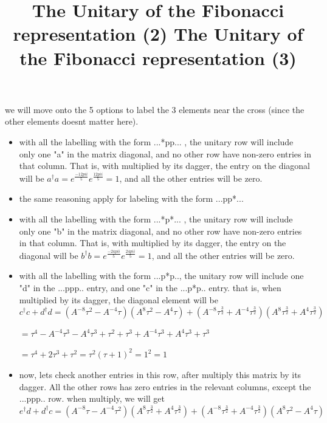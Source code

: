 \documentclass{article}
\begin{document}
{we will move onto the 5 options to label the 3 elements near the cross (since the other elements doesnt matter here).
\begin{itemize}
\item with all the labelling with the form ...*pp... , the unitary row will include only one "a" in the matrix diagonal, and no other row have non-zero entries in that column. That is, with multiplied by its dagger, the entry on the diagonal will be \(a^{\dagger}a = e^{\frac{-12{pi}i}{5}}e^{\frac{12{pi}i}{5}} = 1\), and all the other entries will be zero.
\item the same reasoning apply for labeling with the form ...pp*...  
\end{itemize}


\title{The Unitary of the Fibonacci representation (2) }
\begin{itemize}
\item with all the labelling with the form ...*p*... , the unitary row will include only one "b" in the matrix diagonal, and no other row have non-zero entries in that column. That is, with multiplied by its dagger, the entry on the diagonal will be \(b^{\dagger}b = e^{\frac{-24{pi}i}{5}}e^{\frac{24{pi}i}{5}} = 1\), and all the other entries will be zero.
\item  with all the labelling with the form ...p*p.., the unitary row will include one "d" in the ...ppp.. entry, and one "c" in the ...p*p.. entry. that is, when multiplied by its dagger, the diagonal element will be \(c^{\dagger}c + d^{\dagger}d = (A^{-8}\tau^{2} - A^{-4}\tau)(A^{8}\tau^{2} - A^{4}\tau) + (A^{-8}\tau^{\frac{3}{2}} + A^{-4}\tau^{\frac{3}{2}})(A^{8}\tau^{\frac{3}{2}} + A^{4}\tau^{\frac{3}{2}})\)

\( = \tau^{4} - A^{-4}\tau^{3} - A^{4}\tau^{3} + \tau^{2} + \tau^{3} + A^{-4}\tau^{3} + A^{4}\tau^{3} + \tau^{3}\)

\( = \tau^{4} + 2\tau^{3} + \tau^{2} = {\tau^{2}(\tau+1)}^{2} = 1^{2} = 1\) 
\end{itemize}


\title{The Unitary of the Fibonacci representation (3) }
\begin{itemize}
\item  now, lets check another entries in this row, after multiply this matrix by its dagger.
All the other rows has zero entries in the relevant columns, except the ...ppp.. row. when multiply, we will get \(e^{\dagger}d + d^{\dagger}c = (A^{-8}\tau - A^{-4}\tau^{2})(A^{8}\tau^{\frac{3}{2}} + A^{4}\tau^{\frac{3}{2}}) + (A^{-8}\tau^{\frac{3}{2}} + A^{-4}\tau^{\frac{3}{2}})(A^{8}\tau^{2} - A^{4}\tau)\)


\end{itemize}}
\end{document}
